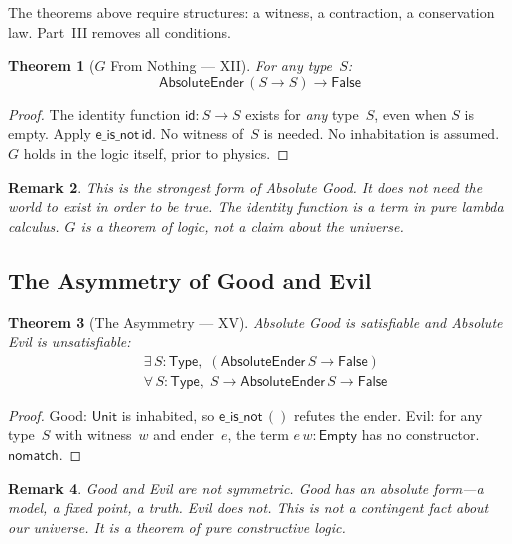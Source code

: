 \documentclass[12pt,a4paper]{article}
\newtheorem{theorem}{Theorem}[section]
\newtheorem{remark}[theorem]{Remark}
\begin{document}
The theorems above require structures: a witness, a contraction,
a conservation law. Part~III removes all conditions.

\begin{theorem}[$G$ From Nothing --- XII]
For any type~$S$:
\[ \mathsf{AbsoluteEnder}\,(S \to S) \to \mathsf{False} \]
\end{theorem}

\begin{proof}
The identity function $\mathsf{id} : S \to S$ exists for \emph{any}
type~$S$, even when $S$ is empty. Apply $\mathsf{e\_is\_not}\,\mathsf{id}$.
No witness of~$S$ is needed. No inhabitation is assumed. $G$ holds
in the logic itself, prior to physics.
\end{proof}

\begin{remark}
This is the strongest form of Absolute Good. It does not need the
world to exist in order to be true. The identity function is a
term in pure lambda calculus. $G$ is a theorem of logic, not a
claim about the universe.
\end{remark}

\subsection{The Asymmetry of Good and Evil}

\begin{theorem}[The Asymmetry --- XV]
Absolute Good is satisfiable and Absolute Evil is unsatisfiable:
\begin{align}
&\exists\, S : \mathsf{Type},\; (\mathsf{AbsoluteEnder}\,S \to \mathsf{False}) \tag{Good has a model} \\
&\forall\, S : \mathsf{Type},\; S \to \mathsf{AbsoluteEnder}\,S \to \mathsf{False} \tag{Evil fails for all}
\end{align}
\end{theorem}

\begin{proof}
Good: $\mathsf{Unit}$ is inhabited, so $\mathsf{e\_is\_not}\,()$ refutes
the ender. Evil: for any type~$S$ with witness~$w$ and ender~$e$, the
term $e\,w : \mathsf{Empty}$ has no constructor. $\mathsf{nomatch}$.
\end{proof}

\begin{remark}
Good and Evil are not symmetric. Good has an absolute form---a model, a
fixed point, a truth. Evil does not. This is not a contingent fact about
our universe. It is a theorem of pure constructive logic.
\end{remark}
\end{document}
